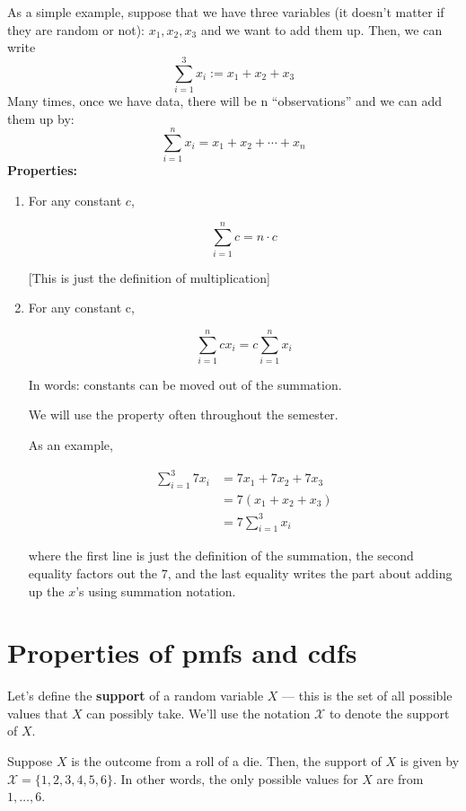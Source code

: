 \documentclass[
  letterpaper,
  DIV=11,
  numbers=noendperiod]{scrreprt}
\begin{document}
As a simple example, suppose that we have three variables (it doesn't
matter if they are random or not): \(x_1,x_2,x_3\) and we want to add
them up. Then, we can write \[
  \sum_{i=1}^3 x_i := x_1 + x_2 + x_3
\] Many times, once we have data, there will be n ``observations'' and
we can add them up by: \[
  \sum_{i=1}^n x_i = x_1 + x_2 + \cdots + x_n
\] \textbf{Properties:}

\begin{enumerate}
\def\labelenumi{\arabic{enumi}.}
\item
  For any constant \(c\),

  \[
   \sum_{i=1}^n c = n \cdot c
   \]

  {[}This is just the definition of multiplication{]}
\item
  For any constant c,

  \[
     \sum_{i=1}^n c x_i = c \sum_{i=1}^n x_i
   \]

  In words: constants can be moved out of the summation.

  We will use the property often throughout the semester.

  As an example,

  \[
     \begin{aligned}
     \sum_{i=1}^3 7 x_i &= 7x_1 + 7x_2 + 7x_3 \\
     &= 7(x_1 + x_2 + x_3) \\
     &= 7 \sum_{i=1}^3 x_i
     \end{aligned}
   \]

  where the first line is just the definition of the summation, the
  second equality factors out the 7, and the last equality writes the
  part about adding up the \(x\)'s using summation notation.
\end{enumerate}

\section{Properties of pmfs and cdfs}\label{properties-of-pmfs-and-cdfs}

Let's define the \textbf{support} of a random variable \(X\) --- this is
the set of all possible values that \(X\) can possibly take. We'll use
the notation \(\mathcal{X}\) to denote the support of \(X\).

Suppose \(X\) is the outcome from a roll of a die. Then, the support of
\(X\) is given by \(\mathcal{X} = \{1,2,3,4,5,6\}\). In other words, the
only possible values for \(X\) are from \(1,\ldots,6\).
\end{document}
